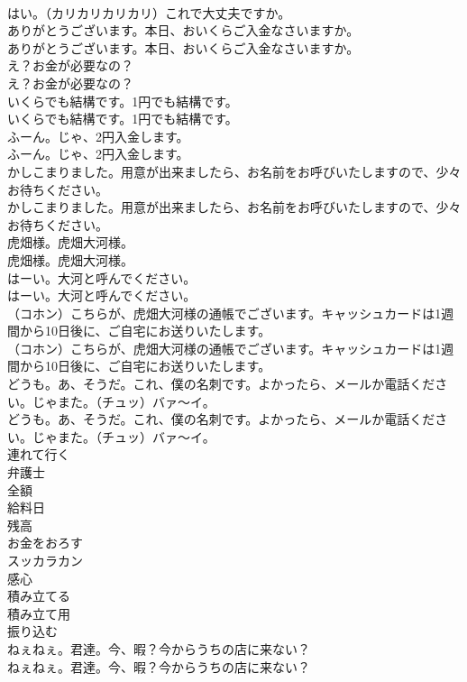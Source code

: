 \documentclass[8pt]{extreport}
\begin{document}
\begin{CJK}{UTF8}{min}
\\	はい。（カリカリカリカリ）これで大丈夫ですか。 
\\	ありがとうございます。本日、おいくらご入金なさいますか。	
\\	ありがとうございます。本日、おいくらご入金なさいますか。 
\\	え？お金が必要なの？	
\\	え？お金が必要なの？ 
\\	いくらでも結構です。1円でも結構です。	
\\	いくらでも結構です。1円でも結構です。 
\\	ふーん。じゃ、2円入金します。	
\\	ふーん。じゃ、2円入金します。 
\\	かしこまりました。用意が出来ましたら、お名前をお呼びいたしますので、少々お待ちください。	
\\	かしこまりました。用意が出来ましたら、お名前をお呼びいたしますので、少々お待ちください。 
\\	虎畑様。虎畑大河様。	
\\	虎畑様。虎畑大河様。 
\\	はーい。大河と呼んでください。	
\\	はーい。大河と呼んでください。 
\\	（コホン）こちらが、虎畑大河様の通帳でございます。キャッシュカードは1週間から10日後に、ご自宅にお送りいたします。	
\\	（コホン）こちらが、虎畑大河様の通帳でございます。キャッシュカードは1週間から10日後に、ご自宅にお送りいたします。 
\\	どうも。あ、そうだ。これ、僕の名刺です。よかったら、メールか電話ください。じゃまた。（チュッ）バァ～イ。	
\\	どうも。あ、そうだ。これ、僕の名刺です。よかったら、メールか電話ください。じゃまた。（チュッ）バァ～イ。 
\\	連れて行く
\\	弁護士
\\	全額
\\	給料日
\\	残高
\\	お金をおろす
\\	スッカラカン
\\	感心
\\	積み立てる
\\	積み立て用
\\	振り込む
\\	ねぇねぇ。君達。今、暇？今からうちの店に来ない？	
\\	ねぇねぇ。君達。今、暇？今からうちの店に来ない？ 

\end{CJK}
\end{document}
